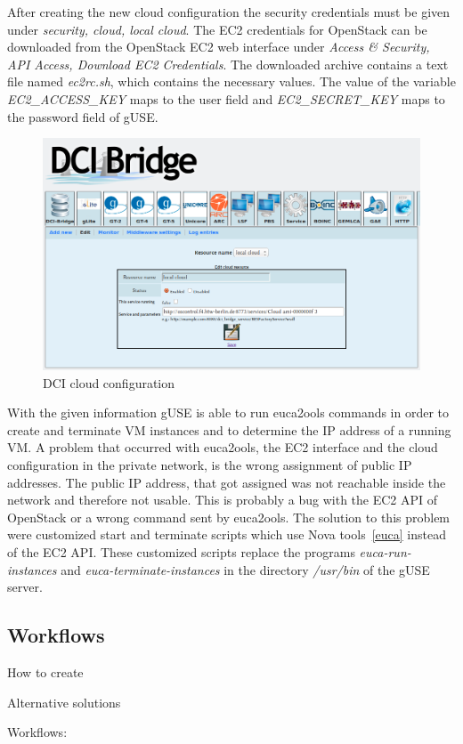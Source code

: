 After creating the new cloud configuration the security credentials must be given under \textit{security, cloud, local cloud}.
The EC2 credentials for OpenStack can be downloaded from the OpenStack EC2 web interface under \textit{Access \& Security, API Access, Download EC2 Credentials}.
The downloaded archive contains a text file named \textit{ec2rc.sh}, which contains the necessary values.
The value of the variable \textit{EC2\_ACCESS\_KEY} maps to the user field and \textit{EC2\_SECRET\_KEY} maps to the password field of gUSE.

\begin{figure}%
                \centering
                \includegraphics[width=2.0\columnwidth]{images/dci-cloud-settings.png}
                \caption{DCI cloud configuration}
                \label{fig:cloudconfig}
\end{figure}

With the given information gUSE is able to run euca2ools commands in order to create and terminate VM instances and to determine the IP address of a running VM.
A problem that occurred with euca2ools, the EC2 interface and the cloud configuration in the private network, is the wrong assignment of public IP addresses.
The public IP address, that got assigned was not reachable inside the network and therefore not usable.
This is probably a bug with the EC2 API of OpenStack or a wrong command sent by euca2ools.
The solution to this problem were customized start and terminate scripts \cite{customscripts} which use Nova tools~\ref{euca} instead of the EC2 API.
These customized scripts replace the programs \textit{euca-run-instances} and \textit{euca-terminate-instances} in the directory \textit{/usr/bin} of the gUSE server.

\subsection{Workflows}\label{workflowimplementation}

How to create

Alternative solutions

Workflows: \cite{somnocqrs} \cite{somnocqrsdl} \cite{somnocqrsone}